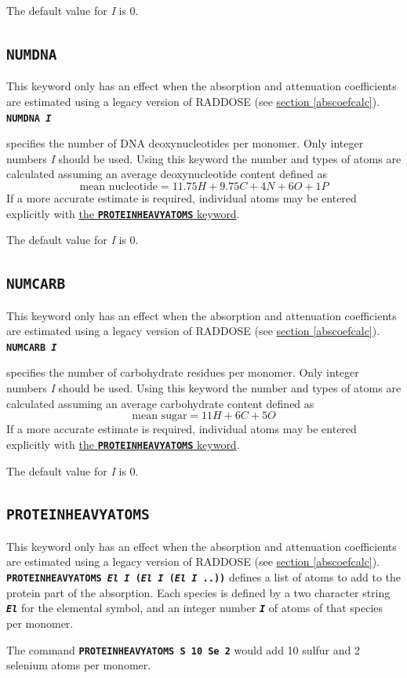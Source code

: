 \documentclass[a4paper]{article}
\newcommand{\Keyword}[1]{\texttt{\textbf{#1}}\xspace}
\newcommand{\SB}{\\[0.2em]}
\newcommand{\RDLegacyKeyword}{This keyword only has an effect when the absorption and attenuation coefficients are estimated using a legacy version of RADDOSE (see \hyperref[abscoefcalc]{section \ref*{abscoefcalc}}).\SB
}
\begin{document}
The default value for \textit{I} is 0.


\subsection{\Keyword{NUMDNA}}
\label{numdna}
\RDLegacyKeyword

\noindent \Keyword{NUMDNA \textit{I}}

specifies the number of DNA deoxynucleotides per monomer. Only integer numbers \textit{I} should be used. Using this keyword the number and types of atoms are calculated assuming an average deoxynucleotide content defined as
\[ \mbox{mean nucleotide} = 11.75H + 9.75C + 4N + 6O + 1P \]
If a more accurate estimate is required, individual atoms may be entered explicitly with \hyperref[proteinheavyatoms]{the \Keyword{PROTEINHEAVYATOMS} keyword}.

The default value for \textit{I} is 0.


\subsection{\Keyword{NUMCARB}}
\label{numcarb}
\RDLegacyKeyword

\noindent \Keyword{NUMCARB \textit{I}}

specifies the number of carbohydrate residues per monomer. Only integer numbers \textit{I} should be used. Using this keyword the number and types of atoms are calculated assuming an average carbohydrate content defined as
\[ \mbox{mean sugar} = 11H + 6C + 5O  \]
If a more accurate estimate is required, individual atoms may be entered explicitly with \hyperref[proteinheavyatoms]{the \Keyword{PROTEINHEAVYATOMS} keyword}.

The default value for \textit{I} is 0.


\subsection{\Keyword{PROTEINHEAVYATOMS}}
\label{proteinheavyatoms}
\RDLegacyKeyword

\noindent \Keyword{PROTEINHEAVYATOMS \textit{El I} (\textit{El I} (\textit{El I} ..))}
defines a list of atoms to add to the protein part of the absorption. Each species is defined by a two character string \Keyword{\textit{El}} for the elemental symbol, and an integer number \Keyword{\textit{I}} of atoms of that species per monomer.

The command \Keyword{PROTEINHEAVYATOMS S 10 Se 2} would add 10 sulfur and 2 selenium atoms per monomer.
\end{document}
